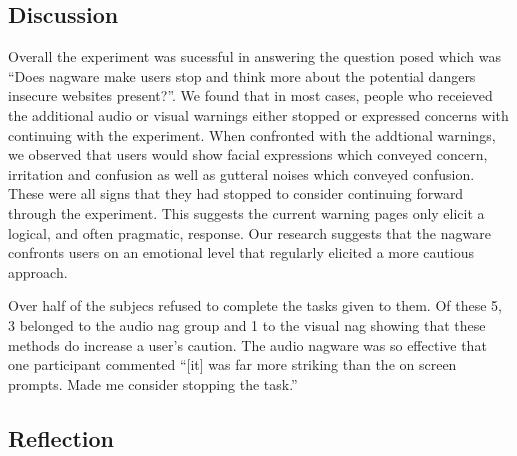 \documentclass{mpaper}
\begin{document}
\subsection{Discussion} 
    

Overall the experiment was sucessful in answering the question posed which was ``Does nagware make users stop and think more about the potential dangers insecure websites present?''. We found that in most cases, people who receieved the additional audio or visual warnings either stopped or expressed concerns with continuing with the experiment. When confronted with the addtional warnings, we observed that users would show facial expressions which conveyed concern, irritation and confusion as well as gutteral noises which conveyed confusion. These were all signs that they had stopped to consider continuing forward through the experiment. This suggests the current warning pages only elicit a logical, and often pragmatic, response. Our research suggests that the nagware confronts users on an emotional level that regularly elicited a more cautious approach. 

Over half of the subjecs refused to complete the tasks given to them. Of these 5,  3 belonged to the audio nag group and 1 to the visual nag showing that these methods do increase a user's caution. The audio nagware was so effective that one participant commented ``[it] was far more striking than the on screen prompts. Made me consider stopping the task.''

\subsection{Reflection} 


\end{document}
